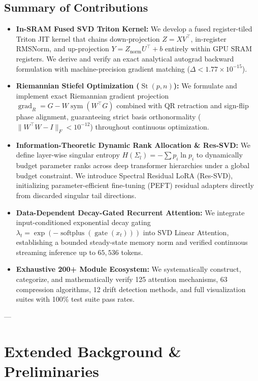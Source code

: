 \documentclass[10pt,twocolumn,letterpaper]{article}
\begin{document}
\subsection{Summary of Contributions}
\begin{itemize}
    \item \textbf{In-SRAM Fused SVD Triton Kernel:} We develop a fused register-tiled Triton JIT kernel that chains down-projection $Z = X V^\top$, in-register RMSNorm, and up-projection $Y = Z_{\text{norm}} U^\top + b$ entirely within GPU SRAM registers. We derive and verify an exact analytical autograd backward formulation with machine-precision gradient matching ($\Delta < 1.77 \times 10^{-15}$).
    \item \textbf{Riemannian Stiefel Optimization ($\operatorname{St}(p, n)$):} We formulate and implement exact Riemannian gradient projection $\operatorname{grad}_R = G - W \operatorname{sym}(W^\top G)$ combined with QR retraction and sign-flip phase alignment, guaranteeing strict basis orthonormality ($\|W^\top W - I\|_F < 10^{-12}$) throughout continuous optimization.
    \item \textbf{Information-Theoretic Dynamic Rank Allocation \& Res-SVD:} We define layer-wise singular entropy $H(\Sigma_l) = -\sum p_i \ln p_i$ to dynamically budget parameter ranks across deep transformer hierarchies under a global budget constraint. We introduce Spectral Residual LoRA (Res-SVD), initializing parameter-efficient fine-tuning (PEFT) residual adapters directly from discarded singular tail directions.
    \item \textbf{Data-Dependent Decay-Gated Recurrent Attention:} We integrate input-conditioned exponential decay gating $\lambda_t = \exp(-\operatorname{softplus}(\operatorname{gate}(x_t)))$ into SVD Linear Attention, establishing a bounded steady-state memory norm and verified continuous streaming inference up to $65,536$ tokens.
    \item \textbf{Exhaustive 200+ Module Ecosystem:} We systematically construct, categorize, and mathematically verify 125 attention mechanisms, 63 compression algorithms, 12 drift detection methods, and full visualization suites with 100\% test suite pass rates.
\end{itemize}

---


\section{Extended Background \& Preliminaries}
\label{sec:background}
\end{document}
